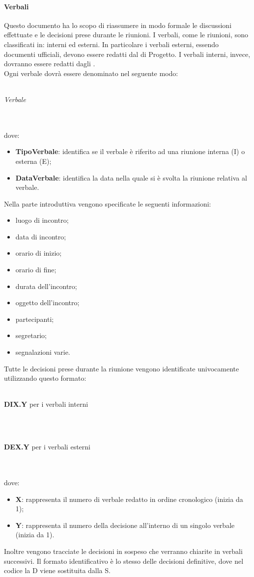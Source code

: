  \paragraph{Verbali}
Questo documento ha lo scopo di riassumere in modo formale le discussioni effettuate e le decisioni prese durante le riunioni. I verbali, come le riunioni, sono classificati in: interni ed esterni. In
particolare i verbali esterni, essendo documenti ufficiali, devono essere redatti dal \RESP{} di Progetto. I verbali interni, invece, dovranno essere redatti dagli \AMMP{}. \\
Ogni verbale dovrà essere denominato nel seguente modo:\\ \\
\centerline{\textit{Verbale}}
\\ \\
dove:
\begin{itemize}
	\item \textbf{TipoVerbale}: identifica se il verbale è riferito ad una riunione interna (I) o esterna (E);
	\item \textbf{DataVerbale}: identifica la data nella quale si è svolta la riunione relativa al verbale.
\end{itemize}
Nella parte introduttiva vengono specificate le seguenti informazioni:
\begin{itemize}
	\item luogo di incontro;
	\item data di incontro;
	\item orario di inizio;
	\item orario di fine;
	\item durata dell'incontro;
	\item oggetto dell'incontro;
	\item partecipanti;
	\item segretario;
	\item segnalazioni varie.
\end{itemize}
Tutte le decisioni prese durante la riunione vengono identificate univocamente utilizzando questo formato: \\ \\
\centerline{\textbf{DIX.Y} per i verbali interni}  \\ \\
\centerline{\textbf{DEX.Y} per i verbali esterni}  \\ \\
dove:
\begin{itemize}
	\item \textbf{X}: rappresenta il numero di verbale redatto in ordine cronologico (inizia da 1);
	\item \textbf{Y}: rappresenta il numero della decisione all'interno di un singolo verbale (inizia da 1).
\end{itemize}
Inoltre vengono tracciate le decisioni in sospeso che verranno chiarite in verbali successivi. Il formato identificativo è lo stesso delle decisioni definitive, dove nel codice la D viene sostituita dalla S.
